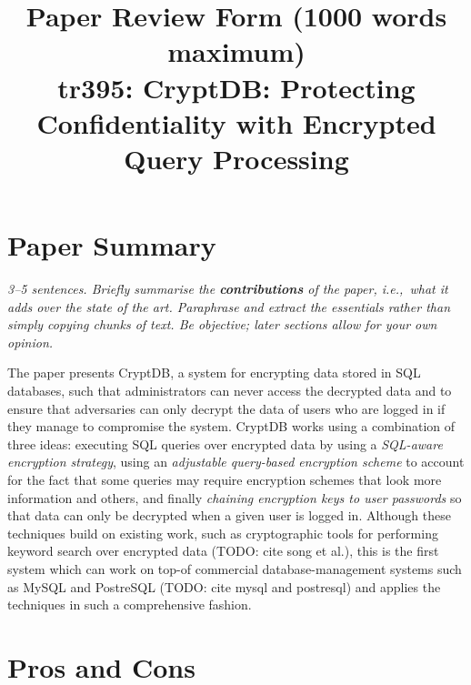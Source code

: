 \documentclass[11pt]{article}
\begin{document}

\title{Paper Review Form (1000 words maximum)\\
    tr395: CryptDB: Protecting Confidentiality with Encrypted Query Processing \cite{CryptDB}}
\maketitle

\section*{Paper Summary}

\textsl{3--5 sentences. Briefly summarise the {\bf contributions} of the paper,
i.e.,~what it adds over the state of the art. Paraphrase and extract the
essentials rather than simply copying chunks of text. Be objective; later
sections allow for your own opinion.}

The paper presents CryptDB, a system for encrypting data stored in SQL
databases, such that administrators can never access the decrypted data and to
ensure that adversaries can only decrypt the data of users who are logged in if
they manage to compromise the system. CryptDB works using a combination of
three ideas: executing SQL queries over encrypted data by using a
\textit{SQL-aware encryption strategy}, using an \textit{adjustable query-based
encryption scheme} to account for the fact that some queries may require
encryption schemes that look more information and others, and finally
\textit{chaining encryption keys to user passwords} so that data can only be
decrypted when a given user is logged in. Although these techniques build on
existing work, such as cryptographic tools for performing keyword search over
encrypted data (TODO: cite song et al.), this is the first system which can
work on top-of commercial database-management systems such as MySQL and
PostreSQL (TODO: cite mysql and postresql) and applies the techniques in such a
comprehensive fashion.

\section*{Pros and Cons}
\end{document}
